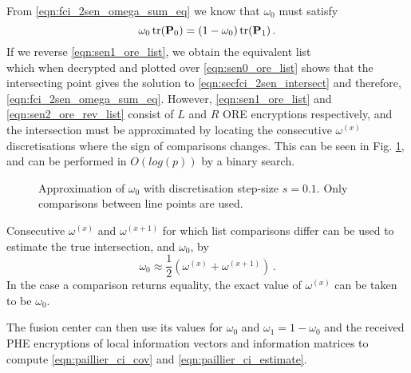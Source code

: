 \documentclass[letterpaper, 10 pt, conference]{ieeeconf}  %
\begin{document}
From \eqref{eqn:fci_2sen_omega_sum_eq} we know that $\omega_0$ must satisfy
\begin{equation}
   \omega_0 \operatorname{tr}({{\mathbf{P}}}_0) = (1-\omega_0)\operatorname{tr}({{\mathbf{P}}}_1)\,. \label{eqn:secfci_2sen_intersect}
\end{equation}
If we reverse \eqref{eqn:sen1_ore_list}, we obtain the equivalent list
\begin{equation}
   [\mathcal{E}^R_{ORE}((1-\omega^{(0)})\tr(\mP_1)),\dots,\mathcal{E}^R_{ORE}((1-\omega^{(p)})\tr(\mP_1))] \label{eqn:sen2_ore_rev_list}
\end{equation}
which when decrypted and plotted over \eqref{eqn:sen0_ore_list} shows that the intersecting point gives the solution to \eqref{eqn:secfci_2sen_intersect} and therefore, \eqref{eqn:fci_2sen_omega_sum_eq}. However, \eqref{eqn:sen1_ore_list} and \eqref{eqn:sen2_ore_rev_list} consist of $L$ and $R$ ORE encryptions respectively, and the intersection must be approximated by locating the consecutive $\omega^{(x)}$ discretisations where the sign of comparisons changes. This can be seen in Fig. \ref{fig:2_sensor_sol}, and can be performed in $O(log(p))$ by a binary search.
\begin{figure}[tb]
   \vspace{-5pt}
   \begin{center}
      
   \end{center}
   \vspace{-10pt}
   \caption{Approximation of $\omega_0$ with discretisation step-size $s=0.1$. Only comparisons between line points are used.}
   \vspace{-\baselineskip}
   \label{fig:2_sensor_sol}
\end{figure}
Consecutive $\omega^{(x)}$ and $\omega^{(x+1)}$ for which list comparisons differ can be used to estimate the true intersection, and $\omega_0$, by
\begin{equation}
   \omega_0 \approx \frac{1}{2}(\omega^{(x)} + \omega^{(x+1)})\,. \label{eqn:secfci_2sen_omega}
\end{equation}
In the case a comparison returns equality, the exact value of $\omega^{(x)}$ can be taken to be $\omega_0$.

The fusion center can then use its values for $\omega_0$ and $\omega_1 = 1-\omega_0$ and the received PHE encryptions of local information vectors and information matrices to compute \eqref{eqn:paillier_ci_cov} and \eqref{eqn:paillier_ci_estimate}.

\end{document}
